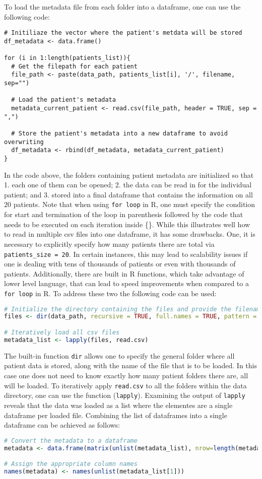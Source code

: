 To load the metadata file from each folder into a dataframe, one can use the following code:
\begin{lstlisting}
# Initiliaze the vector where the patient's metdata will be stored
df_metadata <- data.frame()

for (i in 1:length(patients_list)){
  # Get the filepath for each patient
  file_path <- paste(data_path, patients_list[i], '/', filename, sep="")

  # Load the patient's metadata
  metadata_current_patient <- read.csv(file_path, header = TRUE, sep = ",")

  # Store the patient's metadata into a new dataframe to avoid overwriting
  df_metadata <- rbind(df_metadata, metadata_current_patient)
}
\end{lstlisting}
In the code above, the folders containing patient metadata are initialized so that 1. each one of them can be opened; 2. the data can be read in for the individual patient; and 3. stored into a final dataframe that contains the information on all $20$ patients. Note that when using \verb|for loop| in R, one must specify the condition for start and termination of the loop in parenthesis followed by the code that needs to be executed on each iteration inside \{\}.
While this illustrates well how to read in multiple csv files into one dataframe, it has some drawbacks. One, it is necessary to explicitly specify how many patients there are total via \verb|patients_size = 20|. In certain instances, this may lead to scalability issues if one is dealing with tens of thousands of patients or even with thousands of patients. Additionally, there are built in R functions, which take advantage of lower level language, that can lead to speed improvements when compared to a \verb|for loop| in R.
To address these two the following code can be used:
\begin{lstlisting}[language=R]
# Initialize the directory containing the files and provide the filenames within each folder
files <- dir(data_path, recursive = TRUE, full.names = TRUE, pattern = "metadata.csv$")

# Iteratively load all csv files
metadata_list <- lapply(files, read.csv)
\end{lstlisting}
The built-in function \verb|dir| allows one to specify the general folder where all patient data is stored, along with the name of the file that is to be loaded. In this case one does not need to know exactly how many patient folders there are, all will be loaded. To iteratively apply \verb|read.csv| to all the folders within the data directory, one can use the function (\verb|lapply|).
Examining the output of \verb|lapply| reveals that the data was loaded as a list where the elementes are a single dataframe per loaded file. Combining the list of dataframes into a single dataframe can be achieved as follows:
\begin{lstlisting}[language=R]
# Convert the metadata to a dataframe
metadata <- data.frame(matrix(unlist(metadata_list), nrow=length(metadata_list), byrow=TRUE), stringsAsFactors=FALSE)

# Assign the appropriate column names
names(metadata) <- names(unlist(metadata_list[1]))
\end{lstlisting}

